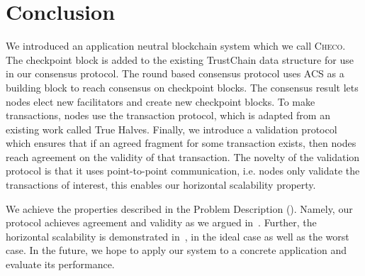 \section{Conclusion}
\label{sec:conclusion}

We introduced an application neutral blockchain system which we call \textsc{Checo}.
The checkpoint block is added to the existing TrustChain data structure for use in our consensus protocol.
The round based consensus protocol uses ACS as a building block to reach consensus on checkpoint blocks.
The consensus result lets nodes elect new facilitators and create new checkpoint blocks.
To make transactions, nodes use the transaction protocol,
which is adapted from an existing work called True Halves.
Finally, we introduce a validation protocol which ensures that if an agreed fragment for some transaction exists,
then nodes reach agreement on the validity of that transaction.
The novelty of the validation protocol is that it uses point-to-point communication,
i.e. nodes only validate the transactions of interest,
this enables our horizontal scalability property.

We achieve the properties described in the Problem Description ().
Namely, our protocol achieves agreement and validity as we argued in~.
Further, the horizontal scalability is demonstrated in~,
in the ideal case as well as the worst case.
In the future, we hope to apply our system to a concrete application and evaluate its performance.

